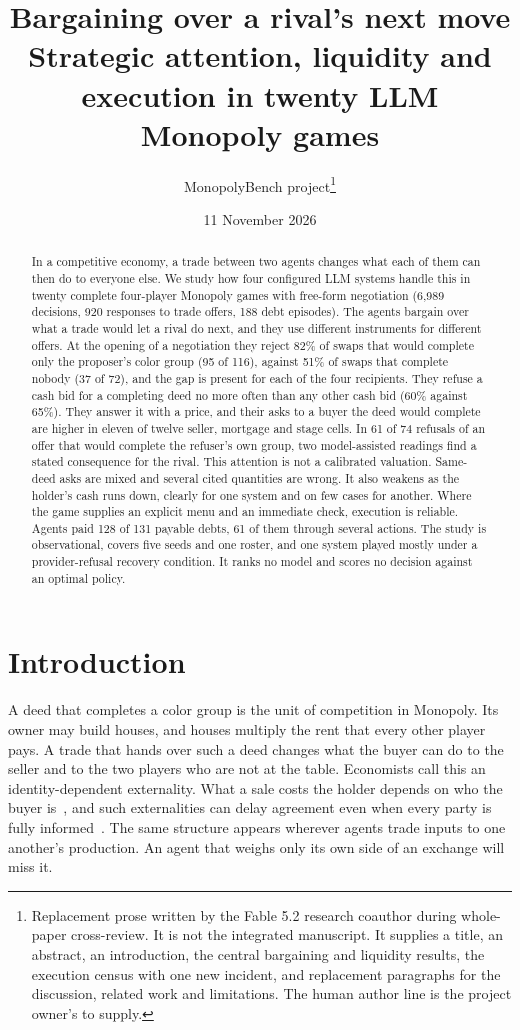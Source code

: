 \documentclass[11pt,letterpaper]{article}
\title{Bargaining over a rival's next move\\[4pt]
\large Strategic attention, liquidity and execution in twenty LLM Monopoly games}
\author{MonopolyBench project\thanks{Replacement prose written by the Fable 5.2 research coauthor during whole-paper cross-review. It is not the integrated manuscript. It supplies a title, an abstract, an introduction, the central bargaining and liquidity results, the execution census with one new incident, and replacement paragraphs for the discussion, related work and limitations. The human author line is the project owner's to supply.}}
\date{11 November 2026}
\newcounter{transcript}
\newcommand{\replaces}[1]{\par\noindent{\footnotesize\color{transcriptmeta}\textit{#1}}\par\smallskip}
\begin{document}

\maketitle

\begin{abstract}
\noindent In a competitive economy, a trade between two agents changes what each of them can then do to everyone else. We study how four configured LLM systems handle this in twenty complete four-player Monopoly games with free-form negotiation (6,989 decisions, 920 responses to trade offers, 188 debt episodes). The agents bargain over what a trade would let a rival do next, and they use different instruments for different offers. At the opening of a negotiation they reject 82\% of swaps that would complete only the proposer's color group (95 of 116), against 51\% of swaps that complete nobody (37 of 72), and the gap is present for each of the four recipients. They refuse a cash bid for a completing deed no more often than any other cash bid (60\% against 65\%). They answer it with a price, and their asks to a buyer the deed would complete are higher in eleven of twelve seller, mortgage and stage cells. In 61 of 74 refusals of an offer that would complete the refuser's own group, two model-assisted readings find a stated consequence for the rival. This attention is not a calibrated valuation. Same-deed asks are mixed and several cited quantities are wrong. It also weakens as the holder's cash runs down, clearly for one system and on few cases for another. Where the game supplies an explicit menu and an immediate check, execution is reliable. Agents paid 128 of 131 payable debts, 61 of them through several actions. The study is observational, covers five seeds and one roster, and one system played mostly under a provider-refusal recovery condition. It ranks no model and scores no decision against an optimal policy.
\end{abstract}

\section{Introduction}
\replaces{Replaces the introduction of each draft.}

A deed that completes a color group is the unit of competition in Monopoly. Its owner may build houses, and houses multiply the rent that every other player pays. A trade that hands over such a deed changes what the buyer can do to the seller and to the two players who are not at the table. Economists call this an identity-dependent externality. What a sale costs the holder depends on who the buyer is~\cite{jehiel1996nuclear}, and such externalities can delay agreement even when every party is fully informed~\cite{jehiel1995delay}. The same structure appears wherever agents trade inputs to one another's production. An agent that weighs only its own side of an exchange will miss it.
\end{document}
